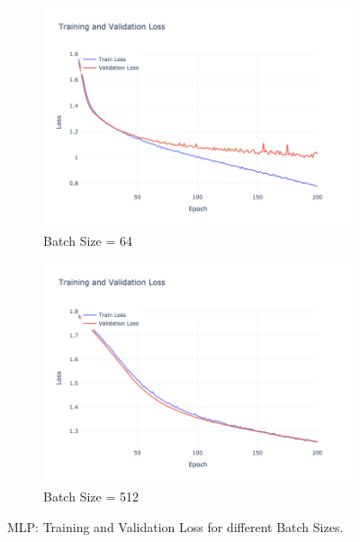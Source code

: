 \begin{figure}[htbp!]
    \centering
    \begin{subfigure}{0.45\textwidth}
        \centering
        \includegraphics[width=\textwidth]{images/mlp-training-validation-loss-batch-64-lr-0.002-epochs-200-hidden-200-dropout-0.3-l2-0.0-layers-2-act-relu-opt-sgd-mom-0.0.png}
        \caption{Batch Size = 64}
    \end{subfigure}
    \hfill
    \begin{subfigure}{0.45\textwidth}
        \centering
        \includegraphics[width=\textwidth]{images/mlp-training-validation-loss-batch-512-lr-0.002-epochs-200-hidden-200-dropout-0.3-l2-0.0-layers-2-act-relu-opt-sgd-mom-0.0.png}
        \caption{Batch Size = 512}
    \end{subfigure}
    \caption{MLP: Training and Validation Loss for different Batch Sizes.}
    \label{fig:mlp_batch_size_loss}
\end{figure}


